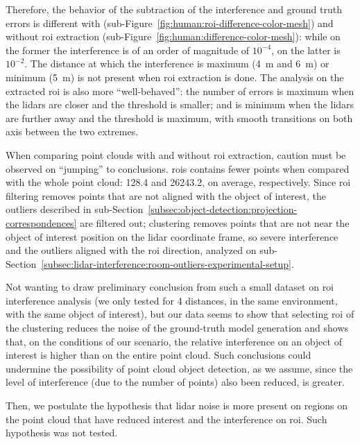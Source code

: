 Therefore, the behavior of the subtraction of the interference and ground truth errors is different with (sub-Figure~\ref{fig:human:roi-difference-color-mesh}) and without \ac{roi} extraction (sub-Figure~\ref{fig:human:difference-color-mesh}): while on the former the interference is of an order of magnitude of $10^{-4}$, on the latter is $10^{-2}$. The distance at which the interference is maximum (\SI{4}{\meter} and \SI{6}{\meter}) or minimum (\SI{5}{\meter}) is not present when \ac{roi} extraction is done. The analysis on the extracted \ac{roi} is also more ``well-behaved'': the number of errors is maximum when the \acp{lidar} are closer and the threshold is smaller; and is minimum when the \acp{lidar} are further away and the threshold is maximum, with smooth transitions on both axis between the two extremes.

When comparing point clouds with and without \ac{roi} extraction, caution must be observed on ``jumping'' to conclusions. \acp{roi} contains fewer points when compared with the whole point cloud: 128.4 and 26243.2, on average, respectively. Since \ac{roi} filtering removes points that are not aligned with the object of interest, the outliers described in sub-Section~\ref{subsec:object-detection:projection-correspondences} are filtered out; clustering removes points that are not near the object of interest position on the \ac{lidar} coordinate frame, so severe interference and the outliers aligned with the \ac{roi} direction, analyzed on sub-Section~\ref{subsec:lidar-interference:room-outliers-experimental-setup}.

Not wanting to draw preliminary conclusion from such a small dataset on \ac{roi} interference analysis (we only tested for 4 distances, in the same environment, with the same object of interest), but our data seems to show that selecting \ac{roi} of the clustering reduces the noise of the ground-truth model generation and shows that, on the conditions of our scenario, the relative interference on an object of interest is higher than on the entire point cloud. Such conclusions could undermine the possibility of point cloud object detection, as we assume, since the level of interference (due to the number of points) also been reduced, is greater.

Then, we postulate the hypothesis that \ac{lidar} noise is more present on regions on the point cloud that have reduced interest and the interference on \ac{roi}. Such hypothesis was not tested.



